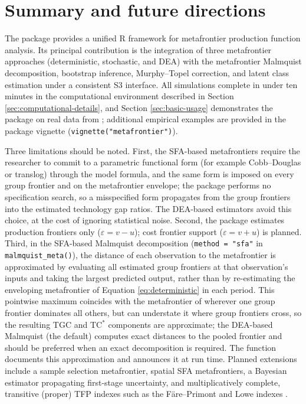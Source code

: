 \section{Summary and future directions}\label{sec:summary}

The  package provides a unified \textsf{R} framework
for metafrontier production function analysis. Its principal contribution
is the integration of three metafrontier approaches (deterministic,
stochastic, and DEA) with the metafrontier Malmquist decomposition,
bootstrap inference, Murphy--Topel correction, and latent class estimation
under a consistent S3 interface. All simulations complete in under ten
minutes in the computational environment described in Section \ref{sec:computational-details}, and
Section \ref{sec:basic-usage} demonstrates the package on real data from ;
additional empirical examples are provided in the package vignette
(\texttt{vignette("metafrontier")}).

Three limitations should be noted. First, the SFA-based metafrontiers
require the researcher to commit to a parametric functional form (for
example Cobb--Douglas or translog) through the model formula, and the same
form is imposed on every group frontier and on the metafrontier envelope;
the package performs no specification search, so a misspecified form
propagates from the group frontiers into the estimated technology gap
ratios. The DEA-based estimators avoid this choice, at the cost of
ignoring statistical noise. Second, the package estimates production
frontiers only (\(\varepsilon = v - u\)); cost frontier support
(\(\varepsilon = v + u\)) is planned. Third, in the SFA-based Malmquist
decomposition (\texttt{method\ =\ "sfa"} in \texttt{malmquist\_meta()}), the distance of
each observation to the metafrontier is approximated by evaluating all
estimated group frontiers at that observation's inputs and taking the
largest predicted output, rather than by re-estimating the enveloping
metafrontier of Equation \eqref{eq:deterministic} in each period. This
pointwise maximum coincides with the metafrontier of \citet{odonnell2008}
wherever one group frontier dominates all others, but can understate it
where group frontiers cross, so the resulting TGC and TC\(^*\) components
are approximate; the DEA-based Malmquist (the default) computes exact
distances to the pooled frontier and should be preferred when an exact
decomposition is required. The function documents this approximation and
announces it at run time. Planned extensions include a sample selection
metafrontier, spatial SFA metafrontiers, a Bayesian estimator propagating
first-stage uncertainty, and multiplicatively complete, transitive
(proper) TFP indexes such as the Färe--Primont and Lowe indexes
\citep{odonnell2012, odonnell2018}.


